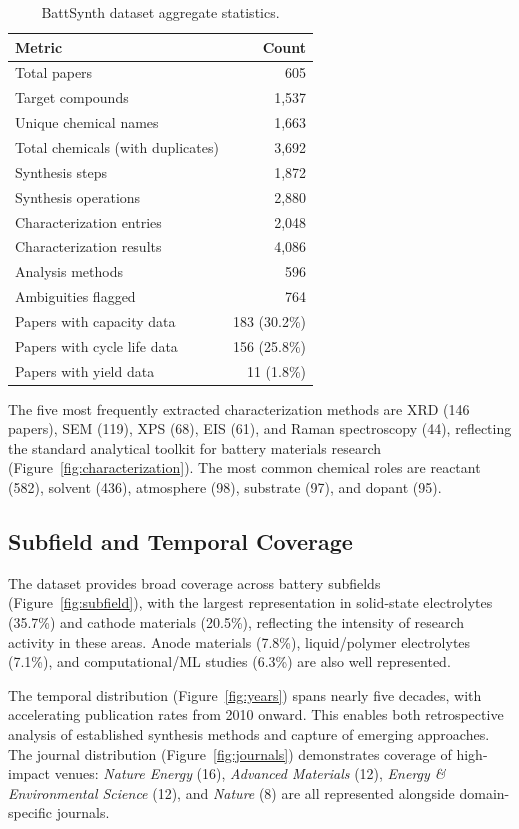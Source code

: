 \documentclass[12pt,a4paper]{article}
\begin{document}
\begin{table}[htbp]
\centering
\caption{BattSynth dataset aggregate statistics.}
\label{tab:dataset_stats}
\begin{tabular}{lr}
\toprule
Metric & Count \\
\midrule
Total papers & 605 \\
Target compounds & 1,537 \\
Unique chemical names & 1,663 \\
Total chemicals (with duplicates) & 3,692 \\
Synthesis steps & 1,872 \\
Synthesis operations & 2,880 \\
Characterization entries & 2,048 \\
Characterization results & 4,086 \\
Analysis methods & 596 \\
Ambiguities flagged & 764 \\
\midrule
Papers with capacity data & 183 (30.2\%) \\
Papers with cycle life data & 156 (25.8\%) \\
Papers with yield data & 11 (1.8\%) \\
\bottomrule
\end{tabular}
\end{table}

The five most frequently extracted characterization methods are XRD (146 papers), SEM (119), XPS (68), EIS (61), and Raman spectroscopy (44), reflecting the standard analytical toolkit for battery materials research (Figure~\ref{fig:characterization}). The most common chemical roles are reactant (582), solvent (436), atmosphere (98), substrate (97), and dopant (95).

\subsection{Subfield and Temporal Coverage}

The dataset provides broad coverage across battery subfields (Figure~\ref{fig:subfield}), with the largest representation in solid-state electrolytes (35.7\%) and cathode materials (20.5\%), reflecting the intensity of research activity in these areas. Anode materials (7.8\%), liquid/polymer electrolytes (7.1\%), and computational/ML studies (6.3\%) are also well represented.

The temporal distribution (Figure~\ref{fig:years}) spans nearly five decades, with accelerating publication rates from 2010 onward. This enables both retrospective analysis of established synthesis methods and capture of emerging approaches. The journal distribution (Figure~\ref{fig:journals}) demonstrates coverage of high-impact venues: \textit{Nature Energy} (16), \textit{Advanced Materials} (12), \textit{Energy \& Environmental Science} (12), and \textit{Nature} (8) are all represented alongside domain-specific journals.
\end{document}
